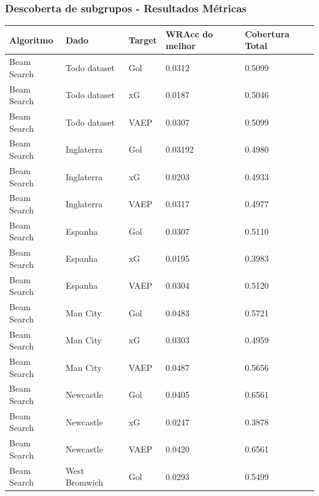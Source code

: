 \documentclass{beamer}
\begin{document}
\begin{frame}
\frametitle{Descoberta de subgrupos - Resultados Métricas}
    \begin{table}[H]
        \centering
        \fontsize{6}{10}\selectfont %
        \begin{tabular}{|l|l|l|l|l|}
            \hline
            \textbf{Algoritmo} & \textbf{Dado} &  \textbf{Target} & 
            \textbf{WRAcc do melhor} & \textbf{Cobertura Total}
            \\
            \hline
            Beam Search & Todo dataset & Gol & 0.0312 & 0.5099 
            \\
            \hline
            Beam Search & Todo dataset & xG & 0.0187 & 0.5046 
            \\
            \hline
            Beam Search & Todo dataset & VAEP & 0.0307 & 0.5099 
            \\
            \hline
            Beam Search & Inglaterra & Gol & 0.03192 & 0.4980 
            \\
            \hline
            Beam Search & Inglaterra & xG & 0.0203 & 0.4933 
            \\
            \hline
            Beam Search & Inglaterra & VAEP & 0.0317 & 0.4977
            \\
            \hline
            Beam Search & Espanha & Gol & 0.0307 & 0.5110 
            \\
            \hline
            Beam Search & Espanha & xG & 0.0195 & 0.3983 
            \\
            \hline
            Beam Search & Espanha & VAEP & 0.0304 & 0.5120 
            \\
            \hline
            Beam Search & Man City & Gol & 0.0483 & 0.5721 
            \\
            \hline
            Beam Search & Man City & xG & 0.0303 & 0.4959 
            \\
            \hline
            Beam Search & Man City & VAEP & 0.0487 & 0.5656 
            \\
            \hline
            Beam Search & Newcastle & Gol & 0.0405 & 0.6561 
            \\
            \hline
            Beam Search & Newcastle & xG & 0.0247 & 0.3878 
            \\
            \hline
            Beam Search & Newcastle & VAEP & 0.0420 & 0.6561 
            \\
            \hline
            Beam Search & West Bromwich & Gol & 0.0293 & 0.5499 

\end{tabular}
\end{table}
\end{frame}
\end{document}
